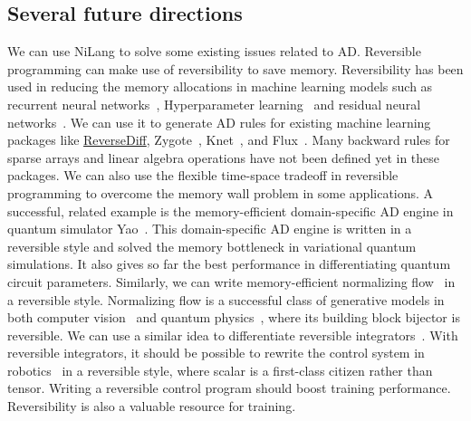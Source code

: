 \documentclass{article}
\newcommand{\<}{\langle}
\renewcommand{\>}{\rangle}
\theoremstyle{definition}\newtheorem{definition}{\textit{Definition}}
\begin{document}
\subsection{Several future directions}\label{sec:outlook}

We can use NiLang to solve some existing issues related to AD.
Reversible programming can make use of reversibility to save memory.
Reversibility has been used in reducing the memory allocations in machine learning models such as recurrent neural networks~\cite{MacKay2018}, Hyperparameter learning~\cite{Maclaurin2015} and residual neural networks~\cite{Behrmann2018}.
We can use it to generate AD rules for existing machine learning packages like \href{https://github.com/JuliaDiff/ReverseDiff.jl}{ReverseDiff}, Zygote~\cite{Innes2019}, Knet~\cite{Yuret2016}, and Flux~\cite{Innes2018a}.
Many backward rules for sparse arrays and linear algebra operations have not been defined yet in these packages.
We can also use the flexible time-space tradeoff in reversible programming to overcome the memory wall problem in some applications.
A successful, related example is the memory-efficient domain-specific AD engine in quantum simulator Yao~\cite{Luo2019}.
This domain-specific AD engine is written in a reversible style and solved the memory bottleneck in variational quantum simulations. It also gives so far the best performance in differentiating quantum circuit parameters.
Similarly, we can write memory-efficient normalizing flow~\cite{Kobyzev2019} in a reversible style. Normalizing flow is a successful class of generative models in both computer vision~\cite{Kingma2018} and quantum physics~\cite{Dinh2016,Li2018}, where its building block bijector is reversible.
We can use a similar idea to differentiate reversible integrators~\cite{Hut1995, Laikov2018}.
With reversible integrators, it should be possible to rewrite the control system in robotics~\cite{Giftthaler2017} in a reversible style, where scalar is a first-class citizen rather than tensor.
Writing a reversible control program should boost training performance.
Reversibility is also a valuable resource for training.
\end{document}
